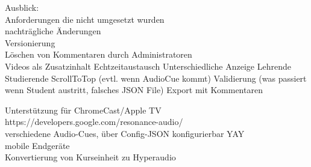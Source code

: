 Ausblick:\\
Anforderungen die nicht umgesetzt wurden\\


nachträgliche Änderungen\\
Versionierung\\


Löschen von Kommentaren durch Administratoren\\
Videos als Zusatzinhalt
Echtzeitaustausch
Unterschiedliche Anzeige Lehrende Studierende
ScrollToTop (evtl. wenn AudioCue kommt)
Validierung (was passiert wenn Student austritt, falsches JSON File)
Export mit Kommentaren

Unterstützung für ChromeCast/Apple TV\\
https://developers.google.com/resonance-audio/\\
verschiedene Audio-Cues, über Config-JSON konfigurierbar YAY\\
mobile Endgeräte\\
Konvertierung von Kurseinheit zu Hyperaudio\\